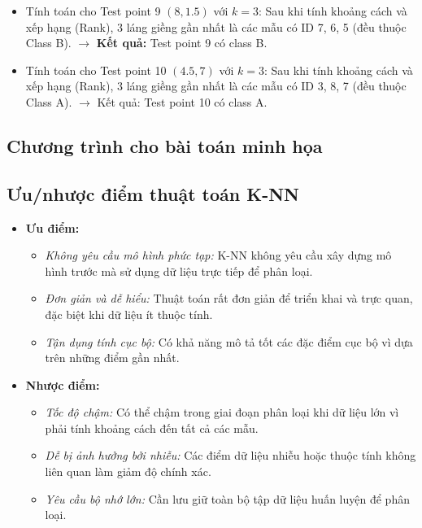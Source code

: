 \begin{itemize}
    \item Tính toán cho Test point 9 $(8, 1.5)$ với $k=3$: Sau khi tính khoảng cách và xếp hạng (Rank), 3 láng giềng gần nhất là các mẫu có ID 7, 6, 5 (đều thuộc Class B). $\rightarrow$ \textbf{Kết quả:} Test point 9 có class B.
    \item Tính toán cho Test point 10 $(4.5, 7)$ với $k=3$: Sau khi tính khoảng cách và xếp hạng (Rank), 3 láng giềng gần nhất là các mẫu có ID 3, 8, 7 (đều thuộc Class A). $\rightarrow$ Kết quả: Test point 10 có class A.
\end{itemize}

\subsection{Chương trình cho bài toán minh họa}


\subsection{Ưu/nhược điểm thuật toán K-NN}
\begin{itemize}
    \item \textbf{Ưu điểm:}
    \begin{itemize}
        \item \textit{Không yêu cầu mô hình phức tạp:} K-NN không yêu cầu xây dựng mô hình trước mà sử dụng dữ liệu trực tiếp để phân loại.
        \item \textit{Đơn giản và dễ hiểu:} Thuật toán rất đơn giản để triển khai và trực quan, đặc biệt khi dữ liệu ít thuộc tính.
        \item \textit{Tận dụng tính cục bộ:} Có khả năng mô tả tốt các đặc điểm cục bộ vì dựa trên những điểm gần nhất.
    \end{itemize}
    \item \textbf{Nhược điểm:}
    \begin{itemize}
        \item \textit{Tốc độ chậm:} Có thể chậm trong giai đoạn phân loại khi dữ liệu lớn vì phải tính khoảng cách đến tất cả các mẫu.
        \item \textit{Dễ bị ảnh hưởng bởi nhiễu:} Các điểm dữ liệu nhiễu hoặc thuộc tính không liên quan làm giảm độ chính xác.
        \item \textit{Yêu cầu bộ nhớ lớn:} Cần lưu giữ toàn bộ tập dữ liệu huấn luyện để phân loại.
    \end{itemize}
\end{itemize}